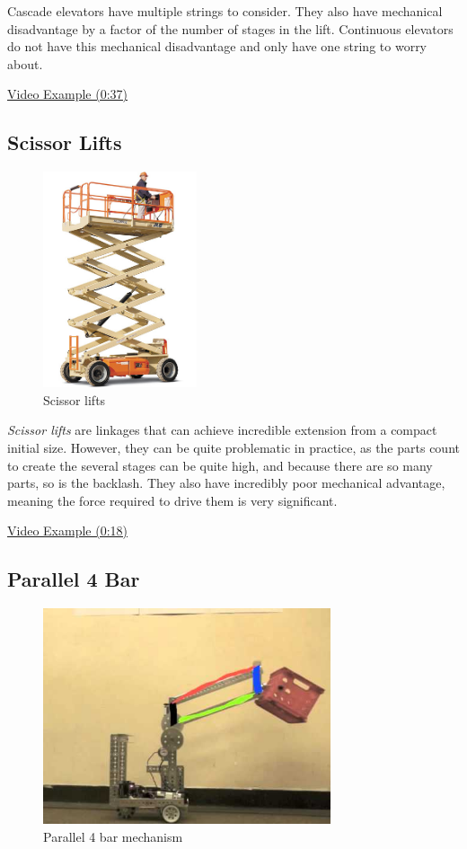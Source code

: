 \documentclass[10pt,letterpaper]{book}
\begin{document}
Cascade elevators have multiple strings to consider. They also have mechanical disadvantage by a factor of the number of stages in the lift. Continuous elevators do not have this mechanical disadvantage and only have one string to worry about.

\href{https://youtu.be/HJVGgaAJefo?t=37}{Video Example (0:37)}
\subsection{Scissor Lifts}
\begin{figure}[H]
	\includegraphics[height=2.5in]{imgs/scissorlift.jpeg}
	\caption{Scissor lifts}
\end{figure}

\textit{Scissor lifts} are linkages that can achieve incredible extension from a compact initial size. However, they can be quite problematic in practice, as the parts count to create the several stages can be quite high, and because there are so many parts, so is the backlash. They also have incredibly poor mechanical advantage, meaning the force required to drive them is very significant.

\href{https://youtu.be/J_VfCjKBGNw?t=18}{\color{red}\underline{Video Example (0:18)}}
\subsection{Parallel 4 Bar}
\begin{figure}[H]
	\includegraphics[height=2.5in]{imgs/parallel_4bar.jpeg}
	\caption{Parallel 4 bar mechanism}
\end{figure}
\end{document}
